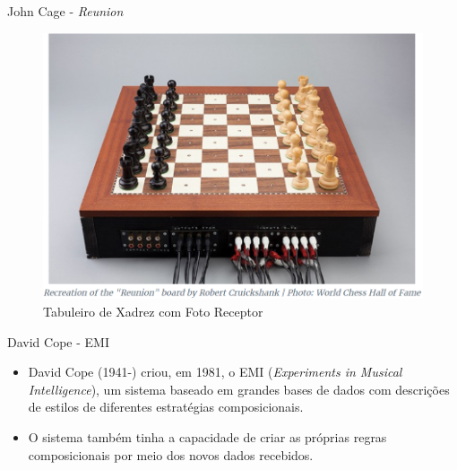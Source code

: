 \documentclass{beamer}
\begin{document}
    \begin{frame}{John Cage - \textit{Reunion}}
        \centering
        \begin{figure}
            \includegraphics[scale=0.35]{figuras/reunion_board.PNG}
		    \caption{Tabuleiro de Xadrez com Foto Receptor}
	    \end{figure}
    \end{frame}

    \begin{frame}{David Cope - EMI}
        \begin{itemize}
            \justifying
            \item David Cope (1941-) criou, em 1981, o EMI (\textit{Experiments in Musical Intelligence}), um sistema baseado em grandes bases de dados com descrições de estilos de diferentes estratégias composicionais.
            \item O sistema também tinha a capacidade de criar as próprias regras composicionais por meio dos novos dados recebidos.
        \end{itemize}
    \end{frame}
\end{document}
